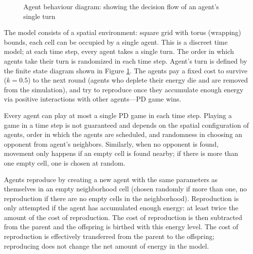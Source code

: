 \documentclass[english]{article}
\begin{document}
\begin{figure}[h]
  \centering
  \caption{Agent behaviour diagram: showing the decision flow of an agent's single turn}
  \label{fig:agent_behaviour}
\end{figure}

The model consists of a spatial environment:
square grid with torus (wrapping) bounds,
each cell can be occupied by a single agent.
This is a discreet time model;
at each time step, every agent takes a single turn.
The order in which agents take their turn is randomized in each time step.
Agent's turn is defined by the finite state diagram shown in Figure \ref{fig:agent_behaviour}.
The agents pay a fixed cost to survive ($k = 0.5$) to the next round (agents who deplete their energy die and are removed from the simulation), and try to reproduce once they accumulate enough energy via positive interactions with other agents---PD game wins.

Every agent can play at most a single PD game in each time step.
Playing a game in a time step is not guaranteed and depends on the spatial configuration of agents, order in which the agents are scheduled, and randomness in choosing an opponent from agent's neighbors.
Similarly, when no opponent is found, movement only happens if an empty cell is found nearby; if there is more than one empty cell, one is chosen at random.

Agents reproduce by creating a new agent with the same parameters as themselves in an empty neighborhood cell (chosen randomly if more than one, no reproduction if there are no empty cells in the neighborhood).
Reproduction is only attempted if the agent has accumulated enough energy: at least twice the amount of the cost of reproduction.
The cost of reproduction is then subtracted from the parent and the offspring is birthed with this energy level.
The cost of reproduction is effectively transferred from the parent to the offspring;
reproducing does not change the net amount of energy in the model.
\end{document}
